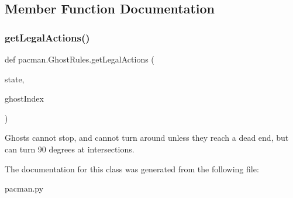 \subsection{Member Function Documentation}
\mbox{\label{classpacman_1_1_ghost_rules_a48577275f722505c68d595515c53859b}} 
\subsubsection{\texorpdfstring{get\+Legal\+Actions()}{getLegalActions()}}
{\footnotesize\ttfamily def pacman.\+Ghost\+Rules.\+get\+Legal\+Actions (\begin{DoxyParamCaption}\item[{}]{state,  }\item[{}]{ghost\+Index }\end{DoxyParamCaption})}

\begin{DoxyVerb}Ghosts cannot stop, and cannot turn around unless they
reach a dead end, but can turn 90 degrees at intersections.
\end{DoxyVerb}
 

The documentation for this class was generated from the following file\+:\begin{DoxyCompactItemize}
\item 
pacman.\+py\end{DoxyCompactItemize}
